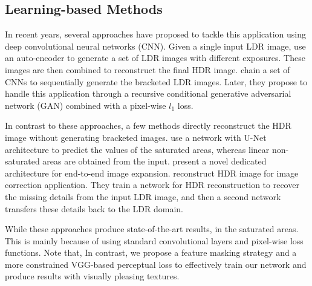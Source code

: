 \subsection{Learning-based Methods}

In recent years, several approaches have proposed to tackle this application using deep convolutional neural networks (CNN). Given a single input LDR image, \citet{endo2017deep} use an auto-encoder \cite{hinton2006reducing} to generate a set of LDR images with different exposures. These images are then combined to reconstruct the final HDR image. \citet{lee2018deep} chain a set of CNNs to sequentially generate the bracketed LDR images. Later, they propose \cite{alee2018deep} to handle this application through a recursive conditional generative adversarial network (GAN) \cite{goodfellow2014generative} combined with a pixel-wise $l_1$ loss.

In contrast to these approaches, a few methods \cite{eilertsen2017hdr, yang2018image, marnerides2018expandnet} directly reconstruct the HDR image without generating bracketed images. \citet{eilertsen2017hdr} use a network with U-Net architecture to predict the values of the saturated areas, whereas linear non-saturated areas are obtained from the input. \citet{marnerides2018expandnet} present a novel dedicated architecture for end-to-end image expansion. \citet{yang2018image} reconstruct HDR image for image correction application. They train a network for HDR reconstruction to recover the missing details from the input LDR image, and then a second network transfers these details back to the LDR domain.

While these approaches produce state-of-the-art results,  in the saturated areas. This is mainly because of using standard convolutional layers and pixel-wise loss functions. Note that,  In contrast, we propose a feature masking strategy and a more constrained VGG-based perceptual loss to effectively train our network and produce results with visually pleasing textures.























